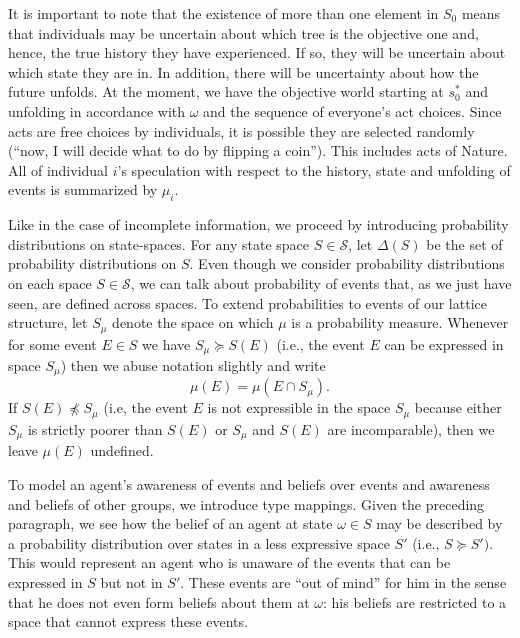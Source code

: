 \documentclass[
11pt,
titlepage,
reqno,
]{article}%
\theoremstyle{definition}
\begin{document}
	It is important to note that the existence of more than one element in $S_0$ means that individuals may be uncertain about which tree is the objective one and, hence, the true history they have experienced. 
	If so, they will be uncertain about which state they are in. 
	In addition, there will be uncertainty about how the future unfolds. 
	At the moment, we have the objective world starting at $s_0^\ast$ and unfolding in accordance with $\omega$ and the sequence of everyone's act choices. 
	Since  acts are free choices by individuals, it is possible they are selected randomly (``now, I will decide what to do by flipping a coin'').
	This includes acts of Nature.
	All of individual $i$'s speculation with respect to the history, state and unfolding of events is summarized by $\mu_i$.
	
	
	Like in the case of incomplete information, we proceed by introducing probability distributions on state-spaces. For any state space $S \in \mathcal{S}$, let $\Delta(S)$ be the set of probability distributions on $S$. Even though we consider probability distributions on each space $S \in \mathcal{S}$, we can talk about probability of events that, as we just have seen, are defined across spaces. To extend probabilities to events of our lattice structure, let $S_{\mu}$ denote the space on which $\mu$ is a probability measure. Whenever for some event $E \in S$ we have $S_{\mu} \succeq S(E)$ (i.e., the event $E$ can be expressed in space $S_{\mu}$) then we abuse notation slightly and write
	\begin{equation*}
		\mu \left( E \right) = \mu \left( E\cap S_{\mu}\right).
	\end{equation*}
	If $S(E) \npreceq S_{\mu}$ (i.e, the event $E$ is not expressible in the space $S_{\mu}$ because either $S_{\mu}$ is strictly poorer than $S(E)$ or $S_{\mu}$ and $S(E)$ are incomparable), then we leave $\mu(E)$ undefined.
	
	To model an agent's awareness of events and beliefs over events and awareness and beliefs of other groups, we introduce type mappings. Given the preceding paragraph, we see how the belief of an agent at state $\omega \in S$ may be described by a probability distribution over states in a less expressive space $S'$ (i.e., $S \succeq S')$. This would represent an agent who is unaware of the events that can be expressed in $S$ but not in $S'$. These events are ``out of mind'' for him in the sense that he does not even form beliefs about them at $\omega$:  his beliefs are restricted to a space that cannot express these events.
	
\end{document}
